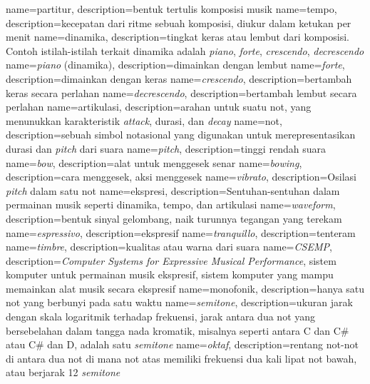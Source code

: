 {
    name=partitur,
    description={bentuk tertulis komposisi musik}
}
{
    name=tempo,
    description={kecepatan dari ritme sebuah komposisi, diukur dalam ketukan per menit}
}
{
	name=dinamika,
	description={tingkat keras atau lembut dari komposisi. Contoh istilah-istilah terkait dinamika adalah \textit{piano}, \textit{forte}, \textit{crescendo}, \textit{decrescendo}}
}
{
	name={\textit{piano} (dinamika)},
	description={dimainkan dengan lembut}
}
{
	name=\textit{forte},
	description={dimainkan dengan keras}
}
{
	name=\textit{crescendo},
	description={bertambah keras secara perlahan}
}
{
	name=\textit{decrescendo},
	description={bertambah lembut secara perlahan}
}
{
	name=artikulasi,
	description={arahan untuk suatu not, yang menunukkan karakteristik \textit{attack}, durasi, dan \textit{decay}}
}
{
	name=not,
	description={sebuah simbol notasional yang digunakan untuk merepresentasikan durasi dan \textit{pitch} dari suara}
}
{
	name=\textit{pitch},
	description={tinggi rendah suara}
}
{
	name=\textit{bow},
	description={alat untuk menggesek senar}
}
{
	name=\textit{bowing},
	description={cara menggesek, aksi menggesek}
}
{
	name=\textit{vibrato},
	description={Osilasi \textit{pitch} dalam satu not}
}
{
	name=ekspresi,
	description={Sentuhan-sentuhan dalam permainan musik seperti dinamika, tempo, dan artikulasi}
}
{
	name=\textit{waveform},
	description={bentuk sinyal gelombang, naik turunnya tegangan yang terekam}
}
{
	name=\textit{espressivo},
	description={ekspresif}
}
{
	name=\textit{tranquillo},
	description={tenteram}
}
{
	name=\textit{timbre},
	description={kualitas atau warna dari suara}
}
{
	name=\textit{CSEMP},
	description={\textit{Computer Systems for Expressive Musical Performance}, sistem komputer untuk permainan musik ekspresif, sistem komputer yang mampu memainkan alat musik secara ekspresif}
}
{
	name=monofonik,
	description={hanya satu not yang berbunyi pada satu waktu}
}
{
	name=\textit{semitone},
	description={ukuran jarak dengan skala logaritmik terhadap frekuensi, jarak antara dua not yang bersebelahan dalam tangga nada kromatik, misalnya seperti antara C dan C\# atau C\# dan D, adalah satu \textit{semitone}}
}
{
	name=\textit{oktaf},
	description={rentang not-not di antara dua not di mana not atas memiliki frekuensi dua kali lipat not bawah, atau berjarak 12 \textit{semitone}	}
}